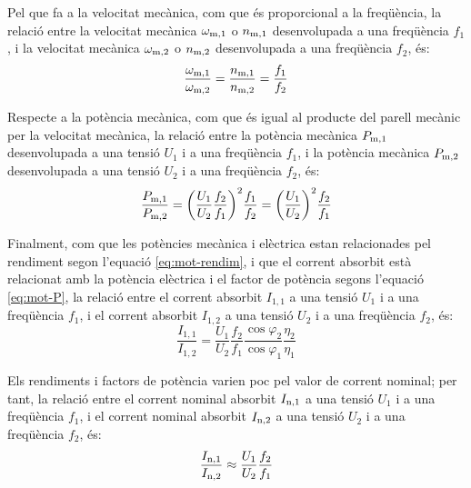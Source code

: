 Pel que fa a la velocitat mecànica, com que és proporcional a la freqüència, la relació entre la velocitat mecànica $\omega_\mathrm{m,1}$ o $n_\mathrm{m,1}$ desenvolupada a una freqüència $f_1$, i la velocitat mecànica $\omega_\mathrm{m,2}$ o $n_\mathrm{m,2}$ desenvolupada a una freqüència $f_2$, és:
\begin{equation}\label{eq:nm_U_f}
	\frac{\omega_\mathrm{m,1}}{\omega_\mathrm{m,2}} = \frac{n_\mathrm{m,1}}{n_\mathrm{m,2}} = \frac{f_1}{f_2}
\end{equation}

Respecte a la  potència mecànica, com que  és igual al producte del parell mecànic per la velocitat mecànica, la relació entre la potència mecànica $P_\mathrm{m,1}$ desenvolupada a una tensió $U_1$ i a una freqüència $f_1$, i la potència mecànica $P_\mathrm{m,2}$ desenvolupada a una tensió $U_2$ i a una freqüència $f_2$, és:
\begin{equation}\label{eq:Pm_U_f}
	\frac{P_\mathrm{m,1}}{P_\mathrm{m,2}} =
	{\left(\frac{{U}_{1}}{{U}_{2}}\frac{{f}_{2}}{{f}_{1}}\right)}^2
	\frac{f_1}{f_2} = 	
	 {\left(\frac{{U}_{1}}{{U}_{2}}\right)}^{2} \frac{{f}_{2}}{{f}_{1}}
\end{equation}

Finalment, com que les potències mecànica i elèctrica estan relacionades pel rendiment segon l'equació \eqref{eq:mot-rendim}, i que el corrent absorbit està relacionat amb la potència elèctrica i el factor de potència segons l'equació \eqref{eq:mot-P}, la relació entre el corrent absorbit $I_{1,1}$  a una tensió $U_1$ i a una freqüència $f_1$, i el corrent absorbit $I_{1,2}$ a una tensió $U_2$ i a una freqüència $f_2$, és:
\begin{equation}
	\frac{I_{1,1}}{I_{1,2}} =
	\frac{U_1}{U_2} \frac{f_2}{f_1} \frac{\cos\varphi_2}{\cos\varphi_1} \frac{\eta_2}{\eta_1}
\end{equation}

Els rendiments i factors de potència varien poc pel valor de corrent nominal; per tant,  la relació entre el corrent nominal absorbit $I_\mathrm{n,1}$  a una tensió $U_1$ i a una freqüència $f_1$, i el corrent nominal absorbit $I_\mathrm{n,2}$ a una tensió $U_2$ i a una freqüència $f_2$, és:
\begin{equation}\label{eq:In_U_f}
	\frac{I_\mathrm{n,1}}{I_\mathrm{n,2}} \approx
	\frac{U_1}{U_2} \frac{f_2}{f_1}
\end{equation}


